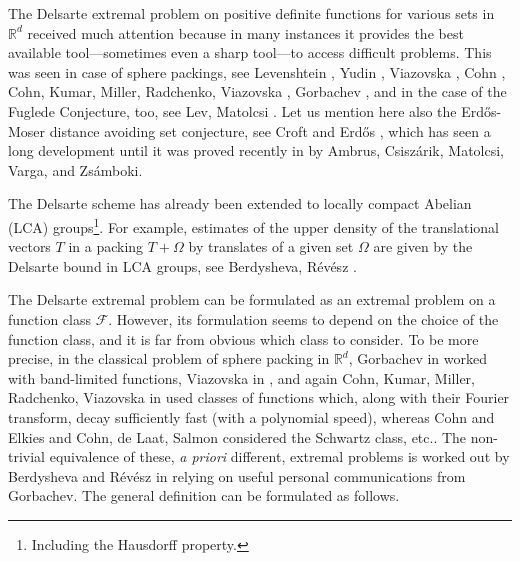 \documentclass[[a4paper,english,12pt]{amsart}
\theoremstyle{plain}
\theoremstyle{remark}
\newcommand{\FF}{\mathcal{F}}
\newcommand{\RR}{\mathbb R}
\begin{document}
The Delsarte extremal problem on positive definite functions for various sets in $\RR^d$ received much attention because in many instances it provides the best available tool---sometimes even a sharp tool---to access difficult problems. This was seen in case of  sphere packings, see Levenshtein \cite{Levenshtein}, Yudin \cite{Yudin}, Viazovska \cite{Viazovska}, Cohn \cite{Cohn}, Cohn, Kumar, Miller, Radchenko, Viazovska  \cite{CKMRV}, Gorbachev \cite{Gorbachev}, and in the case of the Fuglede Conjecture, too, see Lev, Matolcsi \cite{Mat-Lev}. Let us mention here also the Erd\H os-Moser distance avoiding set conjecture, see  Croft \cite{Croft1967} and Erd\H os \cite{Erdos1985}, which has seen a long development until it was proved recently in \cite{ambrus_etal} by Ambrus, Csisz\'arik, Matolcsi, Varga, and Zs\'amboki.

The Delsarte scheme has already been extended to locally compact Abelian (LCA) groups\footnote{Including the Hausdorff property.}. For example, estimates of the upper density of the translational vectors $T$ in a packing $T+\Omega$ by translates of a given set $\Omega$ are given by the Delsarte bound in LCA groups, see Berdysheva, R\'ev\'esz \cite{Berdysheva}.


The Delsarte extremal problem can be formulated as an extremal problem on a function class $\FF$. However, its formulation seems to depend on the choice of the function class, and it is far from obvious which class to consider. To be more precise, in the classical problem of sphere packing in $\RR^d$, Gorbachev in \cite{Gorbachev} worked with band-limited functions, Viazovska in \cite{Viazovska}, and again Cohn, Kumar, Miller, Radchenko, Viazovska in \cite{CKMRV} used classes of functions which, along with their Fourier transform, decay sufficiently fast (with a polynomial speed), whereas Cohn and Elkies \cite{cohn:packings} and Cohn, de Laat, Salmon \cite {Cohn-Laat-Salmon} considered the Schwartz class, etc.. The non-trivial equivalence of these, \emph{a priori} different, extremal problems is worked out by Berdysheva and R\'ev\'esz in \cite{Berdysheva} relying on useful personal communications from Gorbachev. The general definition can be formulated as follows.
\end{document}
